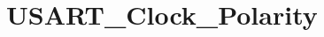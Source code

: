 \hypertarget{group___u_s_a_r_t___clock___polarity}{\section{U\-S\-A\-R\-T\-\_\-\-Clock\-\_\-\-Polarity}
\label{group___u_s_a_r_t___clock___polarity}
}
